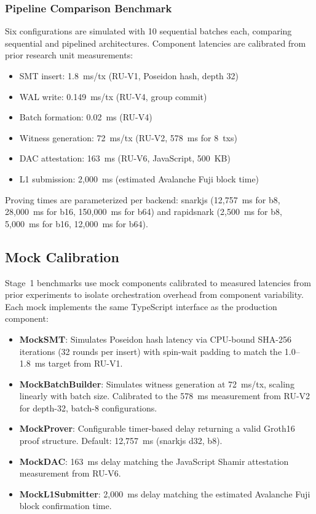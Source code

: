 \subsubsection{Pipeline Comparison Benchmark}

Six configurations are simulated with 10 sequential batches each,
comparing sequential and pipelined architectures. Component latencies
are calibrated from prior research unit measurements:

\begin{itemize}
\item SMT insert: 1.8~ms/tx (RU-V1, Poseidon hash, depth 32)
\item WAL write: 0.149~ms/tx (RU-V4, group commit)
\item Batch formation: 0.02~ms (RU-V4)
\item Witness generation: 72~ms/tx (RU-V2, 578~ms for 8~txs)
\item DAC attestation: 163~ms (RU-V6, JavaScript, 500~KB)
\item L1 submission: 2,000~ms (estimated Avalanche Fuji block time)
\end{itemize}

Proving times are parameterized per backend: snarkjs (12,757~ms for b8,
28,000~ms for b16, 150,000~ms for b64) and rapidsnark (2,500~ms for b8,
5,000~ms for b16, 12,000~ms for b64).

\subsection{Mock Calibration}

Stage~1 benchmarks use mock components calibrated to measured latencies
from prior experiments to isolate orchestration overhead from component
variability. Each mock implements the same TypeScript interface as the
production component:

\begin{itemize}
\item \textbf{MockSMT}: Simulates Poseidon hash latency via CPU-bound
  SHA-256 iterations (32 rounds per insert) with spin-wait padding
  to match the 1.0--1.8~ms target from RU-V1.

\item \textbf{MockBatchBuilder}: Simulates witness generation at 72~ms/tx,
  scaling linearly with batch size. Calibrated to the 578~ms measurement
  from RU-V2 for depth-32, batch-8 configurations.

\item \textbf{MockProver}: Configurable timer-based delay returning a
  valid Groth16 proof structure. Default: 12,757~ms (snarkjs d32, b8).

\item \textbf{MockDAC}: 163~ms delay matching the JavaScript Shamir
  attestation measurement from RU-V6.

\item \textbf{MockL1Submitter}: 2,000~ms delay matching the estimated
  Avalanche Fuji block confirmation time.
\end{itemize}

